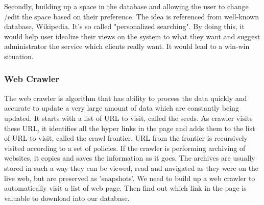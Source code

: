 Secondly, building up a space in the database and allowing the user to change /edit the space based on their preference. The idea is referenced from well-known database, Wikipedia. It's so called "personalized searching".  By doing this, it would help user idealize their views on the system to what they want and suggest administrator the service which clients really want. It would lead to a win-win situation. 
	
	
\subsubsection*{Web Crawler}
The web crawler is algorithm that has ability to process the data quickly and accurate to update a very large amount of data which are constantly being updated.\cite{Liu2012} It starts with a list of URL to visit, called the seeds. As crawler visits these URL, it identifies all the hyper links in the page and adds them to the list of URL to visit, called the crawl frontier. URL from the frontier is recursively visited according to a set of policies. If the crawler is performing archiving of websites, it copies and saves the information as it goes. The archives are usually stored in such a way they can be viewed, read and navigated as they were on the live web, but are preserved as 'snapshots'.\cite{Du2013} We need to build up a web crawler to automatically visit a list of web page. Then find out which link in the page is valuable to download into our database.
	
	
	
